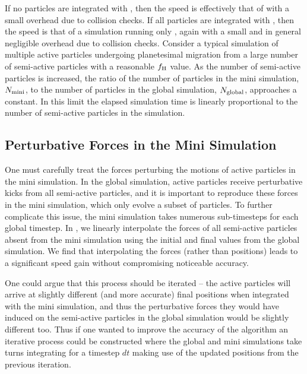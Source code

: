 If no particles are integrated with \ias, then the speed is effectively that of \whfast with a small overhead due to collision checks.
If all particles are integrated with \ias, then the speed is that of a simulation running only \ias, again with a small and in general negligible overhead due to collision checks. 
Consider a typical simulation of multiple active particles undergoing planetesimal migration from a large number of semi-active particles with a reasonable $f_{\rm H}$ value.
As the number of semi-active particles is increased, the ratio of the number of particles in the mini simulation, $N_{\rm mini}$, to the number of particles in the global simulation, $N_{\rm global}$, approaches a constant. 
In this limit the elapsed simulation time is linearly proportional to the number of semi-active particles in the simulation.

\subsection{Perturbative Forces in the Mini Simulation}
\label{sec:add}
One must carefully treat the forces perturbing the motions of active particles in the mini simulation. 
In the global simulation, active particles receive perturbative kicks from all semi-active particles, and it is important to reproduce these forces in the mini simulation, which only evolve a subset of particles. 
To further complicate this issue, the mini simulation takes numerous sub-timesteps for each global timestep.
In \hermes, we linearly interpolate the forces of all semi-active particles absent from the mini simulation using the initial and final values from the global simulation.
We find that interpolating the forces (rather than positions) leads to a significant speed gain without compromising noticeable accuracy.

One could argue that this process should be iterated -- the active particles will arrive at slightly different (and more accurate) final positions when integrated with the mini simulation, and thus the perturbative forces they would have induced on the semi-active particles in the global simulation would be slightly different too.
Thus if one wanted to improve the accuracy of the algorithm an iterative process could be constructed where the global and mini simulations take turns integrating for a timestep $dt$ making use of the updated positions from the previous iteration. 

